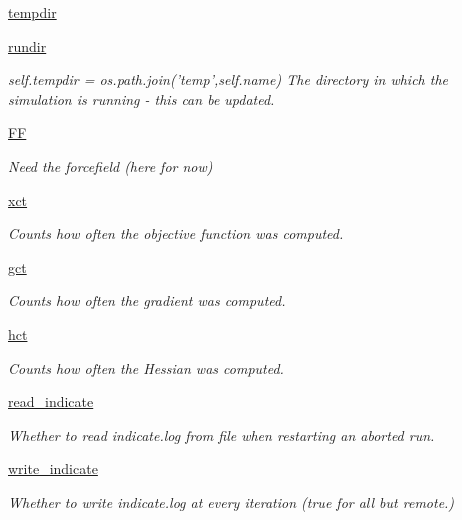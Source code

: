 \begin{DoxyCompactItemize}
\hyperlink{classforcebalance_1_1target_1_1Target_aa1f01b5b78db253b5b66384ed11ed193}{tempdir}
\item 
\hyperlink{classforcebalance_1_1target_1_1Target_a6872de5b2d4273b82336ea5b0da29c9e}{rundir}
\begin{DoxyCompactList}\small\item\em self.\-tempdir = os.\-path.\-join('temp',self.\-name) The directory in which the simulation is running -\/ this can be updated. \end{DoxyCompactList}\item 
\hyperlink{classforcebalance_1_1target_1_1Target_a38a37919783141ea37fdcf8b00ce0aaf}{F\-F}
\begin{DoxyCompactList}\small\item\em Need the forcefield (here for now) \end{DoxyCompactList}\item 
\hyperlink{classforcebalance_1_1target_1_1Target_aad2e385cfbf7b4a68f1c2cb41133fe82}{xct}
\begin{DoxyCompactList}\small\item\em Counts how often the objective function was computed. \end{DoxyCompactList}\item 
\hyperlink{classforcebalance_1_1target_1_1Target_aa625ac88c6744eb14ef281d9496d0dbb}{gct}
\begin{DoxyCompactList}\small\item\em Counts how often the gradient was computed. \end{DoxyCompactList}\item 
\hyperlink{classforcebalance_1_1target_1_1Target_a5b5a42f78052b47f29ed4b940c6111a1}{hct}
\begin{DoxyCompactList}\small\item\em Counts how often the Hessian was computed. \end{DoxyCompactList}\item 
\hyperlink{classforcebalance_1_1target_1_1Target_aa8af57d5be669c4bb1c0cfd4b7a9220e}{read\-\_\-indicate}
\begin{DoxyCompactList}\small\item\em Whether to read indicate.\-log from file when restarting an aborted run. \end{DoxyCompactList}\item 
\hyperlink{classforcebalance_1_1target_1_1Target_a3a2f5d4bbb8d6ecb580eadb261977a57}{write\-\_\-indicate}
\begin{DoxyCompactList}\small\item\em Whether to write indicate.\-log at every iteration (true for all but remote.) \end{DoxyCompactList}\item 

\end{DoxyCompactItemize}
